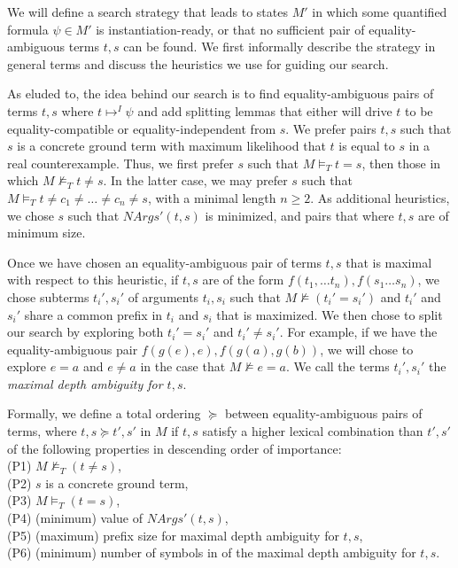 \documentclass{llncs}
\begin{document}
We will define a search strategy that leads to states $M'$ in which some quantified formula $\psi \in M'$ is instantiation-ready, or that no sufficient pair of equality-ambiguous terms $t, s$ can be found.
We first informally describe the strategy in general terms and discuss the heuristics we use for guiding our search.

As eluded to, the idea behind our search is to find equality-ambiguous pairs of terms $t, s$ where $t \mapsto^I \psi$ and add splitting lemmas that either will drive $t$ to be equality-compatible or equality-independent from $s$.
We prefer pairs $t, s$ such that $s$ is a concrete ground term with maximum likelihood that $t$ is equal to $s$ in a real counterexample.
Thus, we first prefer $s$ such that $M \models_T t = s$, then those in which $M \not\models_T t \neq s$.
In the latter case, we may prefer $s$ such that $M \models_T t \neq c_1 \neq \ldots \neq c_n \neq s$, with a minimal length $n \geq 2$.
As additional heuristics, we chose $s$ such that $NArgs'( t, s )$ is minimized, and pairs that where $t, s$ are of minimum size.

Once we have chosen an equality-ambiguous pair of terms $t,s$ that is maximal with respect to this heuristic, if $t, s$ are of the form $f( t_1, \ldots t_n ), f( s_1 \ldots s_n)$, we chose subterms $t_i', s_i'$ of arguments $t_i, s_i$ such that $M \not\models ( t_i' = s_i' )$ and $t_i'$ and $s_i'$ share a common prefix in $t_i$ and $s_i$ that is maximized.
We then chose to split our search by exploring both $t_i' = s_i'$ and $t_i' \neq s_i'$.
For example, if we have the equality-ambiguous pair $f( g( e ), e ), f( g( a ), g( b ) )$, we will chose to explore $e = a$ and $e \neq a$ in the case that $M \not\models e = a$.
We call the terms $t_i', s_i'$ the \emph{maximal depth ambiguity for $t, s$}.

Formally, we define a total ordering $\succeq$ between equality-ambiguous pairs of terms, where $t,s \succeq t',s'$ in $M$ if $t,s$ satisfy a higher lexical combination than $t',s'$ of the following properties in descending order of importance:  \\
(P1) $M \not\models_T (t \neq s)$, \\
(P2) $s$ is a concrete ground term, \\
(P3) $M \models_T (t = s)$, \\
(P4) (minimum) value of $NArgs'( t, s )$, \\
(P5) (maximum) prefix size for maximal depth ambiguity for $t,s$, \\
(P6) (minimum) number of symbols in of the maximal depth ambiguity for $t,s$. \\
\end{document}
